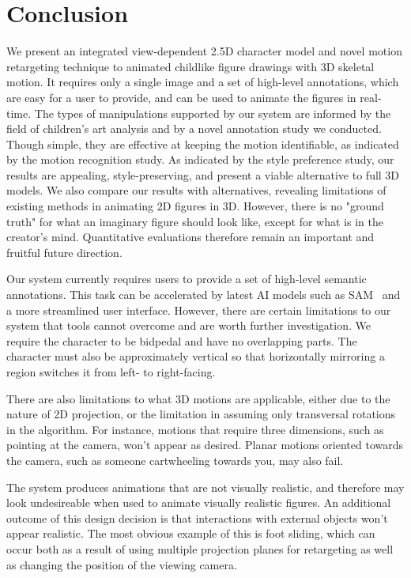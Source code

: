 


\section{Conclusion}

We present an integrated view-dependent 2.5D character model and novel motion retargeting technique to animated childlike figure drawings with 3D skeletal motion.
It requires only a single image and a set of high-level annotations, which are easy for a user to provide, and can be used to animate the figures in real-time.
The types of manipulations supported by our system are informed by the field of children's art analysis and by a novel annotation study we conducted.
Though simple, they are effective at keeping the motion identifiable, as indicated by the motion recognition study. 
As indicated by the style preference study, our results are appealing, style-preserving, and present a viable alternative to full 3D models. We also compare our results with alternatives, revealing limitations of existing methods in animating 2D figures in 3D. However, there is no "ground truth" for what an imaginary figure should look like, except for what is in the creator's mind. Quantitative evaluations therefore remain an important and fruitful future direction.

Our system currently requires users to provide a set of high-level semantic annotations. This task can be accelerated by latest AI models such as SAM~\cite{kirillov2023segment} and a more streamlined user interface.
However, there are certain limitations to our system that tools cannot overcome and are worth further investigation.
We require the character to be bidpedal and have no overlapping parts. 
The character must also be approximately vertical so that horizontally mirroring a region switches it from left- to right-facing.

There are also limitations to what 3D motions are applicable, either due to the nature of 2D projection, or the limitation in assuming only transversal rotations in the algorithm. For instance, motions that require three dimensions, such as pointing at the camera, won't appear as desired. Planar motions oriented towards the camera, such as someone cartwheeling towards you, may also fail.

The system produces animations that are not visually realistic, and therefore may look undesireable when used to animate visually realistic figures. An additional outcome of this design decision is that interactions with external objects won't appear realistic. The most obvious example of this is foot sliding, which can occur both as a result of using multiple projection planes for retargeting as well as changing the position of the viewing camera.

